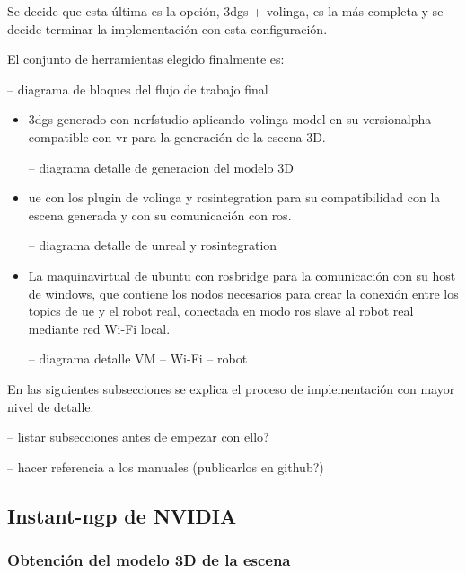 \documentclass[a4paper, 12pt, spanish, twoside]{article}
\begin{document}
Se decide que esta última es la opción, \acrshort{3dgs} + \gls{volinga}, es la más completa y se decide terminar la implementación con esta configuración. 

 

El conjunto de herramientas elegido finalmente es: 

-- diagrama de bloques del flujo de trabajo final 

\begin{itemize} 

\item \acrshort{3dgs} generado con \gls{nerfstudio} aplicando \gls{volinga-model} en su \gls{versionalpha} compatible con \acrshort{vr} para la generación de la escena 3D. 

-- diagrama detalle de generacion del modelo 3D 

\item \acrlong{ue} con los \gls{plugin} de \gls{volinga} y \gls{rosintegration} para su compatibilidad con la escena generada y con su comunicación con \acrshort{ros}. 

-- diagrama detalle de unreal y rosintegration 

\item La \gls{maquinavirtual} de \gls{ubuntu} con \gls{rosbridge} para la comunicación con su \gls{host} de \gls{windows}, que contiene los nodos necesarios para crear la conexión entre los \glspl{topic} de \acrshort{ue} y el robot real, conectada en modo \acrshort{ros} slave al robot real mediante red Wi-Fi local. 

-- diagrama detalle VM – Wi-Fi – robot  

\end{itemize} 

En las siguientes subsecciones se explica el proceso de implementación con mayor nivel de detalle. 

-- listar subsecciones antes de empezar con ello? 

-- hacer referencia a los manuales (publicarlos en github?) 

\subsection{Instant-ngp de NVIDIA} \label{sec:implementacion:instant-ngp}

\subsubsection{Obtención del modelo 3D de la escena} \label{sec:implementacion:instant-ngp:obtencion}
\end{document}
